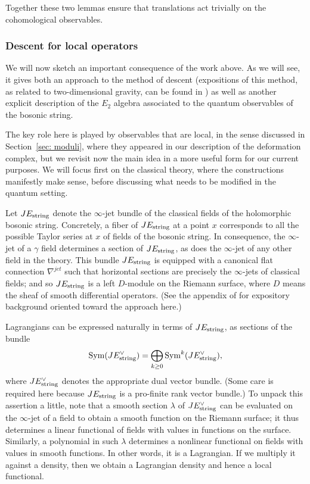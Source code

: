 Together these two lemmas ensure that translations act trivially on the cohomological observables.

\subsubsection{Descent for local operators}

We will now sketch an important consequence of the work above.
As we will see, it gives both an approach to the method of descent 
(expositions of this method, as related to two-dimensional gravity, can be found in \cite{WittenDescent,Dijk})
as well as another explicit description of the $E_2$ algebra associated to the quantum observables of the bosonic string.

The key role here is played by observables that are local,
in the sense discussed in Section~\ref{sec: moduli},
where they appeared in our description of the deformation complex, 
but we revisit now the main idea in a more useful form for our current purposes.
We will focus first on the classical theory, 
where the constructions manifestly make sense,
before discussing what needs to be modified in the quantum setting.

Let $J E_{\rm string}$ denote the $\infty$-jet bundle of the classical fields of the holomorphic bosonic string. 
Concretely, a fiber of $J E_{\rm string}$ at a point $x$ corresponds to all the possible Taylor series at $x$ of fields of the bosonic string.
In consequence, the $\infty$-jet of a $\gamma$ field determines a section of $J E_{\rm string}$, 
as does the $\infty$-jet of any other field in the theory.
This bundle $J E_{\rm string}$ is equipped with a canonical flat connection $\nabla^{jet}$ 
such that horizontal sections are precisely the $\infty$-jets of classical fields;
and so $J E_{\rm string}$ is a left $D$-module on the Riemann surface, 
where $D$ means the sheaf of smooth differential operators.
(See the appendix of \cite{GGLA} for expository background oriented toward the approach here.)

Lagrangians can be expressed naturally in terms of $J E_{\rm string}$, 
as sections of the bundle
\[
{\rm Sym}(J E_{\rm string}^\vee) = \bigoplus_{k \geq 0}{\rm Sym}^k(J E_{\rm string}^\vee),
\]
where $J E_{\rm string}^\vee$ denotes the appropriate dual vector bundle. 
(Some care is required here because $J E_{\rm string}$ is a pro-finite rank vector bundle.)
To unpack this assertion a little, note that a smooth section $\lambda$ of $J E_{\rm string}^\vee$ can be evaluated on the $\infty$-jet of a field to obtain a smooth function on the Riemann surface;
it thus determines a linear functional of fields with values in functions on the surface.
Similarly, a polynomial in such $\lambda$ determines a nonlinear functional on fields with values in smooth functions.
In other words, it is a Lagrangian.
If we multiply it against a density, then we obtain a Lagrangian density and hence a local functional.

